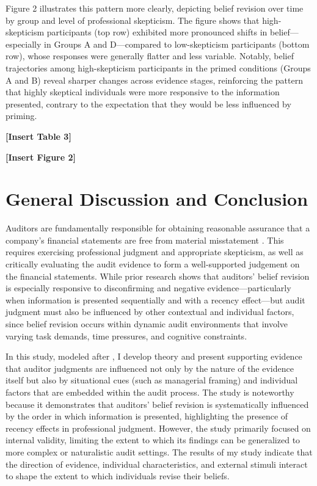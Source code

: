 \documentclass[12pt,english]{article}
\begin{document}
Figure 2 illustrates this pattern more clearly, depicting belief revision over time by group and level of professional skepticism. The figure shows that high-skepticism participants (top row) exhibited more pronounced shifts in belief—especially in Groups A and D—compared to low-skepticism participants (bottom row), whose responses were generally flatter and less variable. Notably, belief trajectories among high-skepticism participants in the primed conditions (Groups A and B) reveal sharper changes across evidence stages, reinforcing the pattern that highly skeptical individuals were more responsive to the information presented, contrary to the expectation that they would be less influenced by priming.

\begin{center}
    \textbf{[Insert Table 3]}
\end{center}

\begin{center}
    \textbf{[Insert Figure 2]}
\end{center}

\section{General Discussion and Conclusion}
Auditors are fundamentally responsible for obtaining reasonable assurance that a company’s financial statements are free from material misstatement \citep{pcaob2024}. This requires exercising professional judgment and appropriate skepticism, as well as critically evaluating the audit evidence to form a well-supported judgement on the financial statements. While prior research \citep{krishnamoorthy1999, ashton1988} shows that auditors' belief revision is especially responsive to disconfirming and negative evidence—particularly when information is presented sequentially and with a recency effect—but audit judgment must also be influenced by other contextual and individual factors, since belief revision occurs within dynamic audit environments that involve varying task demands, time pressures, and cognitive constraints.

In this study, modeled after \citet{ashton1988}, I develop theory and present supporting evidence that auditor judgments are influenced not only by the nature of the evidence itself but also by situational cues (such as managerial framing) and individual factors that are embedded within the audit process. The \citet{ashton1988} study is noteworthy because it demonstrates that auditors’ belief revision is systematically influenced by the order in which information is presented, highlighting the presence of recency effects in professional judgment. However, the study primarily focused on internal validity, limiting the extent to which its findings can be generalized to more complex or naturalistic audit settings. The results of my study indicate that the direction of evidence, individual characteristics, and external stimuli interact to shape the extent to which individuals revise their beliefs. 
\end{document}

